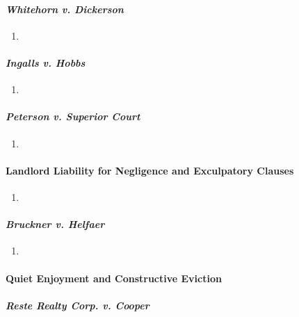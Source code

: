 \paragraph{\emph{Whitehorn v. Dickerson}}

\begin{enumerate}
    \item %
\end{enumerate}

\paragraph{\emph{Ingalls v. Hobbs}}

\begin{enumerate}
    \item %
\end{enumerate}

\paragraph{\emph{Peterson v. Superior Court}}

\begin{enumerate}
    \item %
\end{enumerate}

\paragraph{Landlord Liability for Negligence and Exculpatory Clauses}

\begin{enumerate}
    \item %
\end{enumerate}

\paragraph{\emph{Bruckner v. Helfaer}}

\begin{enumerate}
    \item %
\end{enumerate}

\paragraph{Quiet Enjoyment and Constructive Eviction}

\paragraph{\emph{Reste Realty Corp. v. Cooper}}

